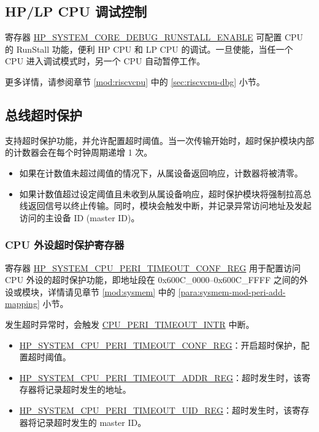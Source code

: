 \documentclass[main\_\_CN.tex]{subfiles}
\begin{document}
\subsection{HP/LP CPU 调试控制}

寄存器 \hyperref[fielddesc:HPSYSTEMCOREDEBUGRUNSTALLENABLE]{HP\_SYSTEM\_CORE\_DEBUG\_RUNSTALL\_ENABLE} 可配置 CPU 的 RunStall 功能，便利 HP CPU 和 LP CPU 的调试。一旦使能，当任一个 CPU 进入调试模式时，另一个 CPU 自动暂停工作。

更多详情，请参阅章节 \ref{mod:riscvcpu} \textit{} 中的 \ref{sec:riscvcpu-dbg}\textit{} 小节。

\subsection{总线超时保护}

\chipname{} 支持超时保护功能，并允许配置超时阈值。当一次传输开始时，超时保护模块内部的计数器会在每个时钟周期递增 1 次。
\begin{itemize}
    \item 如果在计数值未超过阈值的情况下，从属设备返回响应，计数器将被清零。
    \item 如果计数值超过设定阈值且未收到从属设备响应，超时保护模块将强制拉高总线返回信号以终止传输。同时，模块会触发中断，并记录异常访问地址及发起访问的主设备 ID (master ID)。
\end{itemize}


\subsubsection{CPU 外设超时保护寄存器}

寄存器 \hyperref[regdesc:HPSYSTEMCPUPERITIMEOUTCONFREG]{HP\_SYSTEM\_CPU\_PERI\_TIMEOUT\_CONF\_REG} 用于配置访问 CPU 外设的超时保护功能，即地址段在 0x600C\_0000–0x600C\_FFFF 之间的外设或模块，详情请见章节 \ref{mod:sysmem} \textit{} 中的 \ref{para:sysmem-mod-peri-add-mapping} \textit{} 小节。

发生超时异常时，会触发 \hyperref[tab:peripheral-interrupt-config-status-source]{CPU\_PERI\_TIMEOUT\_INTR} 中断。

\begin{itemize}
    \item \hyperref[regdesc:HPSYSTEMCPUPERITIMEOUTCONFREG]{HP\_SYSTEM\_CPU\_PERI\_TIMEOUT\_CONF\_REG}：开启超时保护，配置超时阈值。
    \item \hyperref[regdesc:HPSYSTEMCPUPERITIMEOUTADDRREG]{HP\_SYSTEM\_CPU\_PERI\_TIMEOUT\_ADDR\_REG}：超时发生时，该寄存器将记录超时发生的地址。
    \item \hyperref[regdesc:HPSYSTEMCPUPERITIMEOUTUIDREG]{HP\_SYSTEM\_CPU\_PERI\_TIMEOUT\_UID\_REG}：超时发生时，该寄存器将记录超时发生的 master ID。
\end{itemize}
\end{document}
